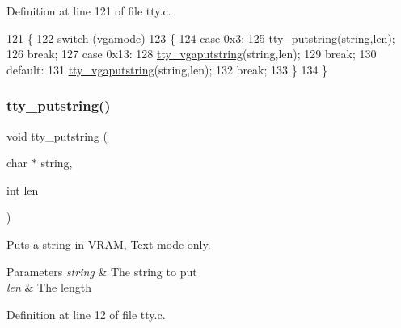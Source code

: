 Definition at line 121 of file tty.\+c.


\begin{DoxyCode}
121                                             \{
122     \textcolor{keywordflow}{switch} (\hyperlink{a00179_af93b0649fdd1bea5b6d29ed37205aa2c_af93b0649fdd1bea5b6d29ed37205aa2c}{vgamode})
123     \{
124     \textcolor{keywordflow}{case} 0x3:
125         \hyperlink{a00179_a5b5bf610a57f3c59b2851fa2652081ec_a5b5bf610a57f3c59b2851fa2652081ec}{tty\_putstring}(\textcolor{keywordtype}{string},len);
126         \textcolor{keywordflow}{break};
127     \textcolor{keywordflow}{case} 0x13:
128         \hyperlink{a00179_a05ca3f5e64f38fec173b635ca8465415_a05ca3f5e64f38fec173b635ca8465415}{tty\_vgaputstring}(\textcolor{keywordtype}{string},len);
129         \textcolor{keywordflow}{break};
130     \textcolor{keywordflow}{default}:
131         \hyperlink{a00179_a05ca3f5e64f38fec173b635ca8465415_a05ca3f5e64f38fec173b635ca8465415}{tty\_vgaputstring}(\textcolor{keywordtype}{string},len);
132         \textcolor{keywordflow}{break};
133     \}
134 \}
\end{DoxyCode}
\mbox{\label{a00179_a5b5bf610a57f3c59b2851fa2652081ec_a5b5bf610a57f3c59b2851fa2652081ec}} 
\subsubsection{\texorpdfstring{tty\+\_\+putstring()}{tty\_putstring()}}
{\footnotesize\ttfamily void tty\+\_\+putstring (\begin{DoxyParamCaption}\item[{char $\ast$}]{string,  }\item[{int}]{len }\end{DoxyParamCaption})}



Puts a string in V\+R\+AM, Text mode only. 


\begin{DoxyParams}{Parameters}
{\em string} & The string to put \\
\hline
{\em len} & The length \\
\hline
\end{DoxyParams}


Definition at line 12 of file tty.\+c.


